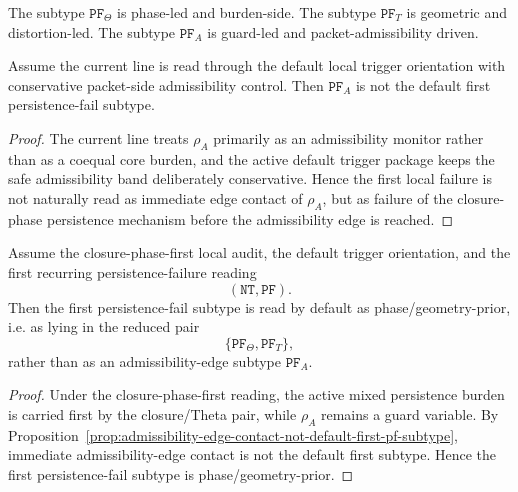 \begin{remark}
\label{rem:how-the-three-subtypes-differ}
The subtype \(\mathtt{PF}_{\Theta}\) is phase-led and burden-side.
The subtype \(\mathtt{PF}_{T}\) is geometric and distortion-led.
The subtype \(\mathtt{PF}_{A}\) is guard-led and packet-admissibility driven.
\end{remark}

\begin{proposition}
\label{prop:admissibility-edge-contact-not-default-first-pf-subtype}
Assume the current line is read through the default local trigger orientation with conservative packet-side admissibility control.
Then \(\mathtt{PF}_{A}\) is not the default first persistence-fail subtype.
\end{proposition}

\begin{proof}
The current line treats \(\rho_A\) primarily as an admissibility monitor rather than as a coequal core burden, and the active default trigger package keeps the safe admissibility band deliberately conservative.
Hence the first local failure is not naturally read as immediate edge contact of \(\rho_A\), but as failure of the closure-phase persistence mechanism before the admissibility edge is reached.
\end{proof}

\begin{proposition}
\label{prop:first-persistence-fail-subtype-is-phase-geometry-prior}
Assume the closure-phase-first local audit, the default trigger orientation, and the first recurring persistence-failure reading
\[
(\mathtt{NT},\mathtt{PF}).
\]
Then the first persistence-fail subtype is read by default as phase/geometry-prior, i.e. as lying in the reduced pair
\[
\{\mathtt{PF}_{\Theta},\mathtt{PF}_{T}\},
\]
rather than as an admissibility-edge subtype \(\mathtt{PF}_{A}\).
\end{proposition}

\begin{proof}
Under the closure-phase-first reading, the active mixed persistence burden is carried first by the closure/Theta pair, while \(\rho_A\) remains a guard variable.
By Proposition~\ref{prop:admissibility-edge-contact-not-default-first-pf-subtype}, immediate admissibility-edge contact is not the default first subtype.
Hence the first persistence-fail subtype is phase/geometry-prior.
\end{proof}

